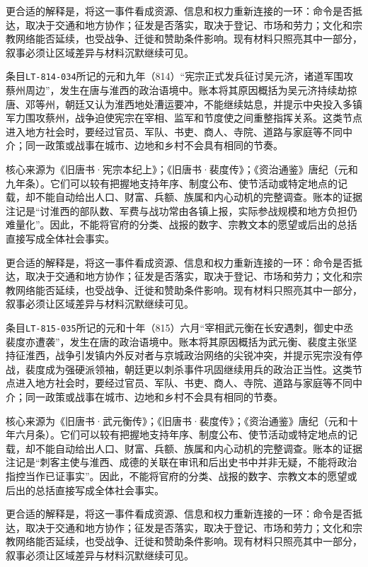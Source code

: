 更合适的解释是，将这一事件看成资源、信息和权力重新连接的一环：命令是否抵达，取决于交通和地方协作；征发是否落实，取决于登记、市场和劳力；文化和宗教网络能否延续，也受战争、迁徙和赞助条件影响。现有材料只照亮其中一部分，叙事必须让区域差异与材料沉默继续可见。

条目\texttt{LT-814-034}所记的元和九年（814）“宪宗正式发兵征讨吴元济，诸道军围攻蔡州周边”，发生在唐与淮西的政治语境中。账本将其原因概括为吴元济持续劫掠唐、邓等州，朝廷又认为淮西地处漕运要冲，不能继续姑息，并提示中央投入多镇军力围攻蔡州，战争迫使宪宗在宰相、监军和节度使之间重整指挥关系。这类节点进入地方社会时，要经过官员、军队、书吏、商人、寺院、道路与家庭等不同中介；同一政策或战事在城市、边地和乡村不会具有相同的节奏。

核心来源为《旧唐书·宪宗本纪上》；《旧唐书·裴度传》；《资治通鉴》唐纪（元和九年条）。它们可以较有把握地支持年序、制度公布、使节活动或特定地点的记载，却不能自动给出人口、财富、兵额、族属和内心动机的完整调查。账本的证据注记是“讨淮西的部队数、军费与战功常由各镇上报，实际参战规模和地方负担仍难量化”。因此，不能将官府的分类、战报的数字、宗教文本的愿望或后出的总括直接写成全体社会事实。

更合适的解释是，将这一事件看成资源、信息和权力重新连接的一环：命令是否抵达，取决于交通和地方协作；征发是否落实，取决于登记、市场和劳力；文化和宗教网络能否延续，也受战争、迁徙和赞助条件影响。现有材料只照亮其中一部分，叙事必须让区域差异与材料沉默继续可见。

条目\texttt{LT-815-035}所记的元和十年（815）六月“宰相武元衡在长安遇刺，御史中丞裴度亦遭袭”，发生在唐的政治语境中。账本将其原因概括为武元衡、裴度主张坚持征淮西，战争引发镇内外反对者与京城政治网络的尖锐冲突，并提示宪宗没有停战，裴度成为强硬派领袖，朝廷更以刺杀事件巩固继续用兵的政治正当性。这类节点进入地方社会时，要经过官员、军队、书吏、商人、寺院、道路与家庭等不同中介；同一政策或战事在城市、边地和乡村不会具有相同的节奏。

核心来源为《旧唐书·武元衡传》；《旧唐书·裴度传》；《资治通鉴》唐纪（元和十年六月条）。它们可以较有把握地支持年序、制度公布、使节活动或特定地点的记载，却不能自动给出人口、财富、兵额、族属和内心动机的完整调查。账本的证据注记是“刺客主使与淮西、成德的关联在审讯和后出史书中并非无疑，不能将政治指控当作已证事实”。因此，不能将官府的分类、战报的数字、宗教文本的愿望或后出的总括直接写成全体社会事实。

更合适的解释是，将这一事件看成资源、信息和权力重新连接的一环：命令是否抵达，取决于交通和地方协作；征发是否落实，取决于登记、市场和劳力；文化和宗教网络能否延续，也受战争、迁徙和赞助条件影响。现有材料只照亮其中一部分，叙事必须让区域差异与材料沉默继续可见。


